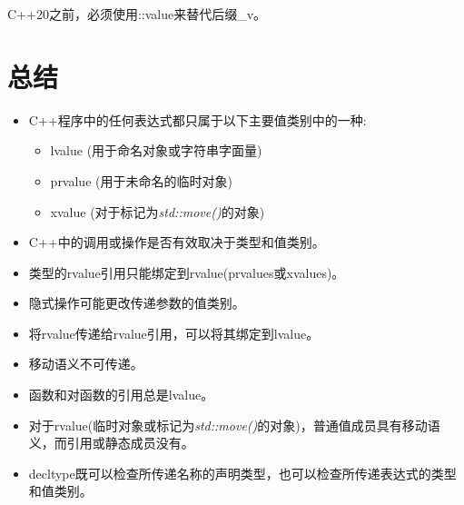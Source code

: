 C++20之前，必须使用::value来替代后缀\_v。\par


\section{总结}

\begin{itemize}
  \item C++程序中的任何表达式都只属于以下主要值类别中的一种:
  \begin{itemize}
    \item[-] lvalue (用于命名对象或字符串字面量)
    \item[-] prvalue (用于未命名的临时对象)
    \item[-] xvalue (对于标记为\textit{std::move()}的对象)
  \end{itemize}
  \item C++中的调用或操作是否有效取决于类型和值类别。
  \item 类型的rvalue引用只能绑定到rvalue(prvalues或xvalues)。
  \item 隐式操作可能更改传递参数的值类别。
  \item 将rvalue传递给rvalue引用，可以将其绑定到lvalue。
  \item 移动语义不可传递。
  \item 函数和对函数的引用总是lvalue。
  \item 对于rvalue(临时对象或标记为\textit{std::move()}的对象)，普通值成员具有移动语义，而引用或静态成员没有。
  \item decltype既可以检查所传递名称的声明类型，也可以检查所传递表达式的类型和值类别。
\end{itemize}
